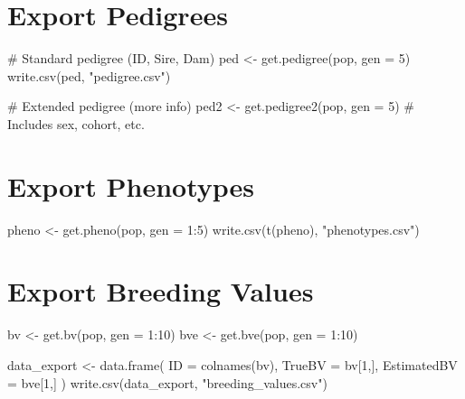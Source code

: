 \documentclass[
  letterpaper,
]{book}
\newenvironment{Shaded}{\begin{snugshade}}{\end{snugshade}}
\newcommand{\AttributeTok}[1]{\textcolor[rgb]{0.40,0.45,0.13}{#1}}
\newcommand{\CommentTok}[1]{\textcolor[rgb]{0.37,0.37,0.37}{#1}}
\newcommand{\DecValTok}[1]{\textcolor[rgb]{0.68,0.00,0.00}{#1}}
\newcommand{\FunctionTok}[1]{\textcolor[rgb]{0.28,0.35,0.67}{#1}}
\newcommand{\NormalTok}[1]{\textcolor[rgb]{0.00,0.23,0.31}{#1}}
\newcommand{\OtherTok}[1]{\textcolor[rgb]{0.00,0.23,0.31}{#1}}
\newcommand{\SpecialCharTok}[1]{\textcolor[rgb]{0.37,0.37,0.37}{#1}}
\newcommand{\StringTok}[1]{\textcolor[rgb]{0.13,0.47,0.30}{#1}}
\begin{document}
\section{Export Pedigrees}\label{export-pedigrees}

\begin{Shaded}
\begin{Highlighting}[]
\CommentTok{\# Standard pedigree (ID, Sire, Dam)}
\NormalTok{ped }\OtherTok{\textless{}{-}} \FunctionTok{get.pedigree}\NormalTok{(pop, }\AttributeTok{gen =} \DecValTok{5}\NormalTok{)}
\FunctionTok{write.csv}\NormalTok{(ped, }\StringTok{"pedigree.csv"}\NormalTok{)}

\CommentTok{\# Extended pedigree (more info)}
\NormalTok{ped2 }\OtherTok{\textless{}{-}} \FunctionTok{get.pedigree2}\NormalTok{(pop, }\AttributeTok{gen =} \DecValTok{5}\NormalTok{)  }\CommentTok{\# Includes sex, cohort, etc.}
\end{Highlighting}
\end{Shaded}

\section{Export Phenotypes}\label{export-phenotypes}

\begin{Shaded}
\begin{Highlighting}[]
\NormalTok{pheno }\OtherTok{\textless{}{-}} \FunctionTok{get.pheno}\NormalTok{(pop, }\AttributeTok{gen =} \DecValTok{1}\SpecialCharTok{:}\DecValTok{5}\NormalTok{)}
\FunctionTok{write.csv}\NormalTok{(}\FunctionTok{t}\NormalTok{(pheno), }\StringTok{"phenotypes.csv"}\NormalTok{)}
\end{Highlighting}
\end{Shaded}

\section{Export Breeding Values}\label{export-breeding-values}

\begin{Shaded}
\begin{Highlighting}[]
\NormalTok{bv }\OtherTok{\textless{}{-}} \FunctionTok{get.bv}\NormalTok{(pop, }\AttributeTok{gen =} \DecValTok{1}\SpecialCharTok{:}\DecValTok{10}\NormalTok{)}
\NormalTok{bve }\OtherTok{\textless{}{-}} \FunctionTok{get.bve}\NormalTok{(pop, }\AttributeTok{gen =} \DecValTok{1}\SpecialCharTok{:}\DecValTok{10}\NormalTok{)}

\NormalTok{data\_export }\OtherTok{\textless{}{-}} \FunctionTok{data.frame}\NormalTok{(}
  \AttributeTok{ID =} \FunctionTok{colnames}\NormalTok{(bv),}
  \AttributeTok{TrueBV =}\NormalTok{ bv[}\DecValTok{1}\NormalTok{,],}
  \AttributeTok{EstimatedBV =}\NormalTok{ bve[}\DecValTok{1}\NormalTok{,]}
\NormalTok{)}
\FunctionTok{write.csv}\NormalTok{(data\_export, }\StringTok{"breeding\_values.csv"}\NormalTok{)}
\end{Highlighting}
\end{Shaded}
\end{document}
